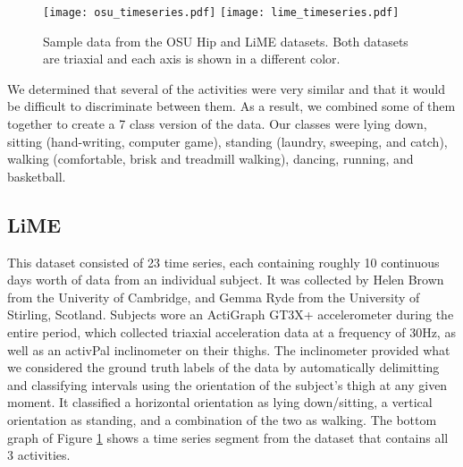 \begin{figure}
 \centering
 \texttt{[image: osu\_timeseries.pdf]}
 \texttt{[image: lime\_timeseries.pdf]}
 \caption{Sample data from the OSU Hip and LiME datasets. Both datasets are
 triaxial and each axis is shown in a different color.}
 \label{fig:timeseries}
\end{figure}


We determined that several of the activities were very similar and that
it would be difficult to discriminate between them. As a result, we combined some of them together to
create a 7 class version of the data.
Our classes were lying down, sitting (hand-writing, computer game),
standing (laundry, sweeping, and catch), walking (comfortable, brisk and treadmill walking),
dancing, running, and basketball.

\subsection{LiME}
This dataset consisted of 23 time series, each containing roughly 10 continuous
days worth of data from an individual subject. It was collected by Helen Brown from
the Univerity of Cambridge, and Gemma Ryde from the University of Stirling, Scotland.
Subjects wore an ActiGraph GT3X+
accelerometer during the entire period, which collected triaxial acceleration data at a frequency
of 30Hz, as well as an activPal inclinometer on their thighs. The inclinometer
provided what we considered the ground truth labels of the data by automatically
delimitting and classifying intervals using the orientation of the subject's thigh at any given moment. It 
classified a horizontal orientation as lying down/sitting,
a vertical orientation as standing, and a combination of the two as walking.
The bottom graph of Figure \ref{fig:timeseries} shows a time series segment
from the dataset that contains all 3 activities.

